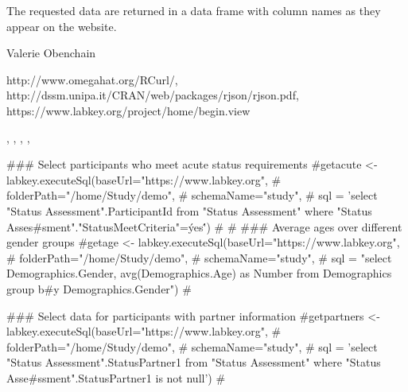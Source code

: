 \documentclass{article}
\begin{document}
\begin{Value}
The requested data are returned in a data frame with column names as they appear on the website.
\end{Value}
\begin{Author}\relax
Valerie Obenchain
\end{Author}
\begin{References}\relax
http://www.omegahat.org/RCurl/,\\ 
http://dssm.unipa.it/CRAN/web/packages/rjson/rjson.pdf,\\
https://www.labkey.org/project/home/begin.view
\end{References}
\begin{SeeAlso}\relax
{}, , , 
, 
\end{SeeAlso}
\begin{Examples}
\begin{ExampleCode}

### Select participants who meet acute status requirements
#getacute <- labkey.executeSql(baseUrl="https://www.labkey.org",
#                            folderPath="/home/Study/demo",
#                            schemaName="study",
#                            sql = 'select "Status Assessment".ParticipantId from "Status Assessment" where "Status Asses#sment"."StatusMeetCriteria"=\'yes\'')
#
#
### Average ages over different gender groups
#getage <- labkey.executeSql(baseUrl="https://www.labkey.org",
#                            folderPath="/home/Study/demo",
#                            schemaName="study",
#                            sql = "select Demographics.Gender, avg(Demographics.Age) as Number from Demographics group b#y Demographics.Gender")
#

### Select data for participants with partner information 
#getpartners <- labkey.executeSql(baseUrl="https://www.labkey.org",
#                            folderPath="/home/Study/demo",
#                            schemaName="study",
#                            sql = 'select "Status Assessment".StatusPartner1 from "Status Assessment" where "Status Asse#ssment".StatusPartner1 is not null')
#



\end{ExampleCode}
\end{Examples}
\end{document}
